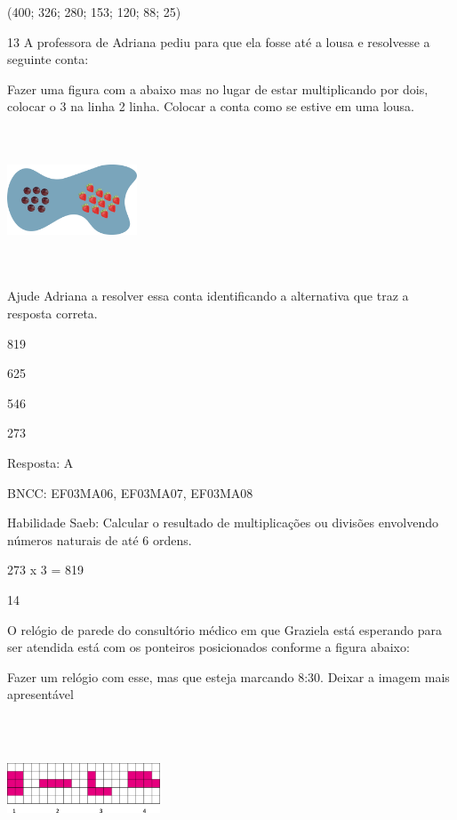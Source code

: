 \begin{escolha}
{\begin{escolha}
{(400; 326; 280; 153; 120; 88; 25)

\num{13} A professora de Adriana pediu para que ela fosse até a lousa e
resolvesse a seguinte conta:

Fazer uma figura com a abaixo mas no lugar de estar multiplicando por
dois, colocar o 3 na linha 2 linha. Colocar a conta como se estive em
uma lousa.

\includegraphics[width=1.51680in,height=1.67515in]{media/image114.png}

Ajude Adriana a resolver essa conta identificando a alternativa que traz
a resposta correta.

\begin{escolha}
\item
  819
\item
  625
\item
  546
\item
  273
\end{escolha}

Resposta: A

BNCC: EF03MA06, EF03MA07, EF03MA08

Habilidade Saeb: Calcular o resultado de multiplicações ou divisões
envolvendo números naturais de até 6 ordens.

273 x 3 = 819

\num{14}

O relógio de parede do consultório médico em que Graziela está esperando
para ser atendida está com os ponteiros posicionados conforme a figura
abaixo:

Fazer um relógio com esse, mas que esteja marcando 8:30. Deixar a imagem
mais apresentável

\includegraphics[width=1.79182in,height=1.69181in]{media/image115.png}

}
\end{escolha}}
\end{escolha}
